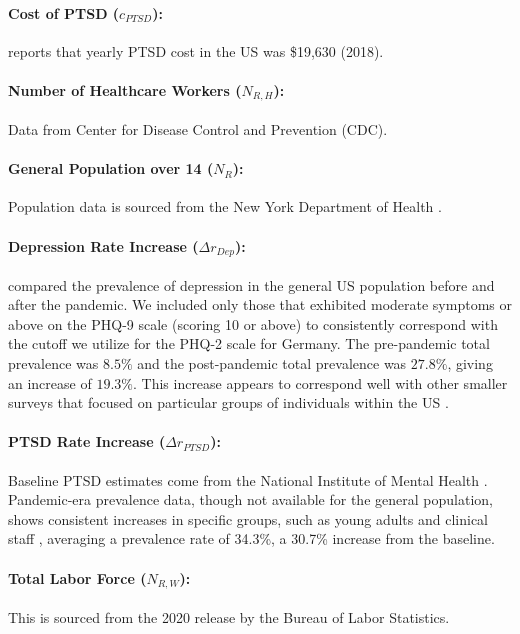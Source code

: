 \documentclass[msom,blindrev]{informs3} %
\begin{document}
\begin{APPENDICES}
\paragraph{Cost of PTSD ($c_{PTSD}$):}  reports that yearly PTSD cost in the US was \$19,630 (2018).

\paragraph{Number of Healthcare Workers ($N_{R,H}$):} Data from Center for Disease Control and Prevention (CDC).

\paragraph{General Population over 14 ($N_{R}$):} Population data is sourced from the New York Department of Health .
\paragraph{Depression Rate Increase ($\Delta r_{Dep}$):}  compared the prevalence of depression in the general US population before and after the pandemic. We included only those that exhibited moderate symptoms or above on the PHQ-9 scale (scoring 10 or above) to consistently correspond with the cutoff we utilize for the PHQ-2 scale for Germany. The pre-pandemic total prevalence was $8.5\%$ and the post-pandemic total prevalence was $27.8\%$, giving an increase of $19.3\%$. This increase appears to correspond well with other smaller surveys that focused on particular groups of individuals within the US . 

\paragraph{PTSD Rate Increase ($\Delta r_{PTSD}$):} Baseline PTSD estimates come from the National Institute of Mental Health . Pandemic-era prevalence data, though not available for the general population, shows consistent increases in specific groups, such as young adults  and clinical staff , averaging a prevalence rate of 34.3\%, a 30.7\% increase from the baseline.

\paragraph{Total Labor Force ($N_{R,W}$):} This is sourced from the 2020 release by the Bureau of Labor Statistics.


\end{APPENDICES}
\end{document}

